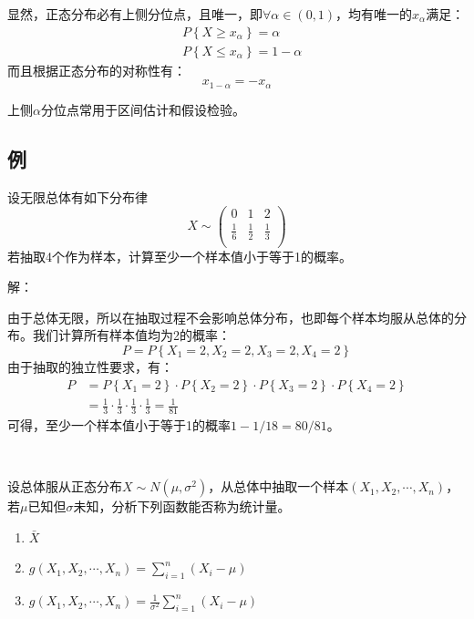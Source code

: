 显然，正态分布必有上侧分位点，且唯一，即$\forall \alpha \in \left( 0,1 \right) $，均有唯一的$x_{\alpha}$满足：
\begin{align*}
&P\left\{ X\geqslant x_{\alpha} \right\} =\alpha \\
&P\left\{ X\leqslant x_{\alpha} \right\} =1-\alpha
\end{align*}
而且根据正态分布的对称性有：
\[
x_{1-\alpha}=-x_{\alpha}
\]

\begin{tcolorbox}
上侧$\alpha $分位点常用于区间估计和假设检验。
\end{tcolorbox}

\subsection{例}

\begin{example}
设无限总体有如下分布律
\[
X\sim \left( \begin{matrix}
	0&		1&		2\\
	\frac{1}{6}&		\frac{1}{2}&		\frac{1}{3}\\
\end{matrix} \right)
\]
若抽取4个作为样本，计算至少一个样本值小于等于1的概率。
\end{example}

解：

由于总体无限，所以在抽取过程不会影响总体分布，也即每个样本均服从总体的分布。我们计算所有样本值均为2的概率：
\[
P=P\left\{ X_1=2,X_2=2,X_3=2,X_4=2 \right\}
\]
由于抽取的独立性要求，有：
\begin{align*}
P&=P\left\{ X_1=2 \right\} \cdot P\left\{ X_2=2 \right\} \cdot P\left\{ X_3=2 \right\} \cdot P\left\{ X_4=2 \right\} \\
&=\frac{1}{3}\cdot \frac{1}{3}\cdot \frac{1}{3}\cdot \frac{1}{3}=\frac{1}{81}
\end{align*}
可得，至少一个样本值小于等于1的概率$1-1/18=80/81$。

~

\begin{example}
设总体服从正态分布$X\sim N\left( \mu ,\sigma ^2 \right) $，从总体中抽取一个样本$\left( X_1,X_2,\cdots ,X_n \right) $，若$\mu $已知但$\sigma $未知，分析下列函数能否称为统计量。
\begin{enumerate}
    \item $\bar{X}$
    \item $g\left( X_1,X_2,\cdots ,X_n \right) =\sum_{i=1}^n{\left( X_i-\mu \right)}$
    \item $g\left( X_1,X_2,\cdots ,X_n \right) =\frac{1}{\sigma ^2}\sum_{i=1}^n{\left( X_i-\mu \right)}$
\end{enumerate}
\end{example}

